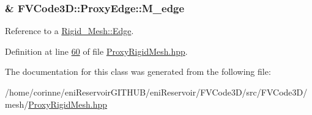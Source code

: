 \subsubsection[{\texorpdfstring{M\+\_\+edge}{M_edge}}]{\& F\+V\+Code3\+D\+::\+Proxy\+Edge\+::\+M\+\_\+edge\hspace{0.3cm}{\ttfamily [private]}}\hypertarget{classFVCode3D_1_1ProxyEdge_aaf251030dfaa502e9280eb2dbb65094d}{}\label{classFVCode3D_1_1ProxyEdge_aaf251030dfaa502e9280eb2dbb65094d}


Reference to a \hyperlink{classFVCode3D_1_1Rigid__Mesh_1_1Edge}{Rigid\+\_\+\+Mesh\+::\+Edge}. 



Definition at line \hyperlink{ProxyRigidMesh_8hpp_source_l00060}{60} of file \hyperlink{ProxyRigidMesh_8hpp_source}{Proxy\+Rigid\+Mesh.\+hpp}.



The documentation for this class was generated from the following file\+:\begin{DoxyCompactItemize}
\item 
/home/corinne/eni\+Reservoir\+G\+I\+T\+H\+U\+B/eni\+Reservoir/\+F\+V\+Code3\+D/src/\+F\+V\+Code3\+D/mesh/\hyperlink{ProxyRigidMesh_8hpp}{Proxy\+Rigid\+Mesh.\+hpp}\end{DoxyCompactItemize}
